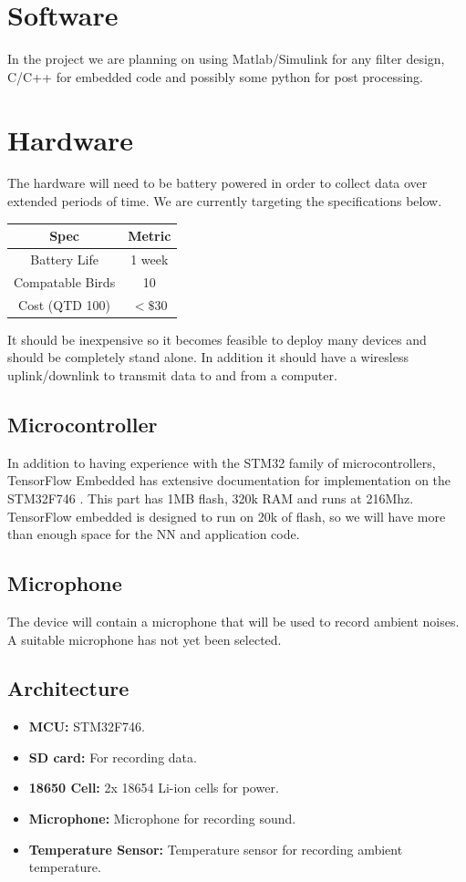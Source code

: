 \documentclass{article}
\begin{document}
\section{Software} In the project we are planning on using Matlab/Simulink for any filter design, C/C++ for embedded code and possibly some python for post processing.

\section{Hardware}
The hardware will need to be battery powered in order to collect data over extended periods of time. We are currently targeting the specifications below.

\begin{center}
\begin{tabular}{ c | c }
Spec             & Metric\\ 
\hline 
Battery Life     & 1 week\\
Compatable Birds & 10    \\
Cost (QTD 100)   & $<\$30$  \\
\end{tabular}
\end{center}

It should be inexpensive so it becomes feasible to deploy many devices and should be completely stand alone. In addition it should have a wiresless uplink/downlink to transmit data to and from a computer.

\subsection{Microcontroller}
In addition to having experience with the STM32 family of microcontrollers, TensorFlow Embedded \cite{TF} has extensive documentation for implementation on the STM32F746 \cite{STM}. This part has 1MB flash, 320k RAM and runs at 216Mhz. TensorFlow embedded is designed to run on 20k of flash, so we will have more than enough space for the NN and application code.

\subsection{Microphone}
The device will contain a microphone that will be used to record ambient noises. A suitable microphone has not yet been selected.

\subsection{Architecture}
\begin{itemize}
\item{\textbf{MCU:} STM32F746.}
\item{\textbf{SD card:} For recording data.}
\item{\textbf{18650 Cell:} 2x 18654 Li-ion cells for power.}
\item{\textbf{Microphone:} Microphone for recording sound.}
\item{\textbf{Temperature Sensor:} Temperature sensor for recording ambient temperature.}
\end{itemize}
\end{document}
